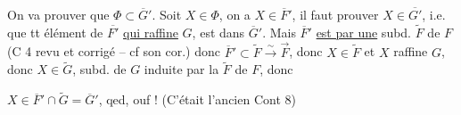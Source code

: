On va prouver que $\Phi\subset\overline G'$. Soit $X\in\Phi$, on a $X\in\overline F'$,  il faut prouver $X\in\overline{G'}$, i.e.  que tt élément de $\overline{F'}$ \uline{qui raffine} $G$, est dans $\overline G'$. Mais $\overline F'$ \uline{est  par une} subd. $\widetilde F$ de $F$ (C 4 revu et corrigé -- cf son cor.) donc $\overline F'\subset\widetilde F\xrightarrow{\sim}\overrightarrow F$, donc $X\in\widetilde F$ et $X$ raffine $G$, donc  $X\in\widetilde G$, subd. de $G$ induite par la  $\widetilde F$ de $F$, donc


\deleted{$\Phi$} $X\in\overline F'\cap\widetilde G=\overline G'$, qed, ouf ! (C'était l'ancien Cont 8)

